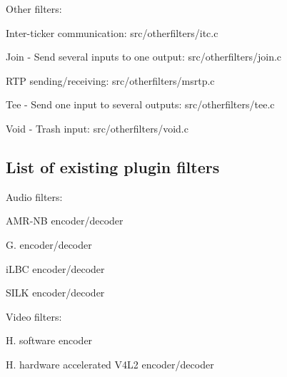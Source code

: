 \begin{DoxyItemize}
\begin{DoxyItemize}
\begin{DoxyItemize}
\end{DoxyItemize}
\end{DoxyItemize}
\item Other filters\+:
\begin{DoxyItemize}
\item Inter-\/ticker communication\+: src/otherfilters/itc.\+c
\item Join -\/ Send several inputs to one output\+: src/otherfilters/join.\+c
\item R\+TP sending/receiving\+: src/otherfilters/msrtp.\+c
\item Tee -\/ Send one input to several outputs\+: src/otherfilters/tee.\+c
\item Void -\/ Trash input\+: src/otherfilters/void.\+c
\end{DoxyItemize}
\end{DoxyItemize}\subsection{List of existing plugin filters}\label{group__filters_list_of_plugin_filters}

\begin{DoxyItemize}
\item Audio filters\+:
\begin{DoxyItemize}
\item A\+M\+R-\/\+NB encoder/decoder
\item G. encoder/decoder
\item i\+L\+BC encoder/decoder
\item S\+I\+LK encoder/decoder
\end{DoxyItemize}
\item Video filters\+:
\begin{DoxyItemize}
\item H. software encoder
\item H. hardware accelerated V4\+L2 encoder/decoder 
\end{DoxyItemize}
\end{DoxyItemize}